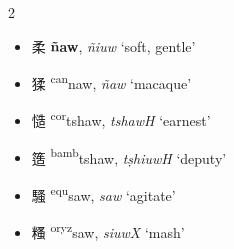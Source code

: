 \begin{multicols}{2}
\begin{itemize}
\end{itemize}

\medskip


\begin{itemize}

    \item {\Large{柔}} %
    {\large{\textbf{ñaw}}},
    \textit{ñiuw} `soft, gentle'        %

    \item {\Large{猱}} %
    {\large{{\textsuperscript{can}}naw}},
    \textit{ñaw} `macaque'        %

\end{itemize}

\medskip

\begin{itemize}

    \item {\Large{慥}} %
    {\large{{\textsuperscript{cor}}tshaw}},
    \textit{tshawH} `earnest'        %

    \item {\Large{簉}} %
    {\large{{\textsuperscript{bamb}}tshaw}},
    \textit{tṣhiuwH} `deputy'        %

\end{itemize}

\medskip

\begin{itemize}

    \item {\Large{騷}} %
    {\large{{\textsuperscript{equ}}saw}},
    \textit{saw} `agitate'        %

    \item {\Large{糔}} %
    {\large{{\textsuperscript{oryz}}saw}},
    \textit{siuwX} `mash'        %

\end{itemize}


\end{multicols}
